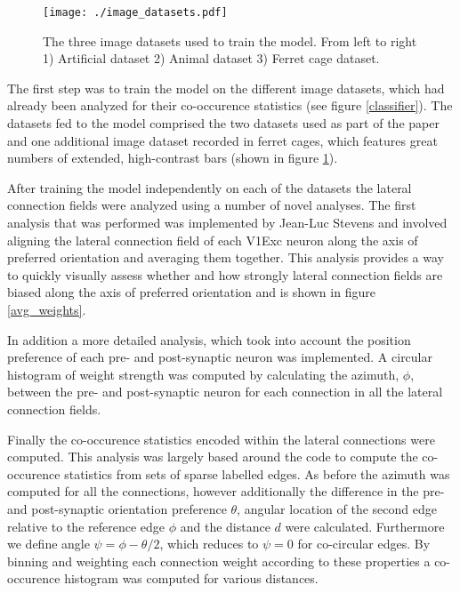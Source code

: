 \begin{figure}
	\centering
	\texttt{[image: ./image\_datasets.pdf]}
	\caption[]%
            {The three image datasets used to train the model. From
      left to right 1) Artificial dataset 2) Animal dataset 3) Ferret
      cage dataset.}
    \label{datasets}
\end{figure}

The first step was to train the model on the different image datasets,
which had already been analyzed for their co-occurence statistics (see
figure \ref{classifier}). The datasets fed to the model comprised the
two datasets used as part of the paper and one additional image
dataset recorded in ferret cages, which features great numbers of
extended, high-contrast bars (shown in figure \ref{datasets}).

After training the model independently on each of the datasets the
lateral connection fields were analyzed using a number of novel
analyses. The first analysis that was performed was implemented by
Jean-Luc Stevens and involved aligning the lateral connection field of
each V1Exc neuron along the axis of preferred orientation and
averaging them together. This analysis provides a way to quickly
visually assess whether and how strongly lateral connection fields are
biased along the axis of preferred orientation and is shown in figure
\ref{avg_weights}.

In addition a more detailed analysis, which took into account the
position preference of each pre- and post-synaptic neuron was
implemented. A circular histogram of weight strength was computed by
calculating the azimuth, $\phi$, between the pre- and post-synaptic
neuron for each connection in all the lateral connection fields.

Finally the co-occurence statistics encoded within the lateral
connections were computed. This analysis was largely based around the
\cite{Perrinet2015} code to compute the co-occurence statistics from
sets of sparse labelled edges. As before the azimuth was computed for
all the connections, however additionally the difference in the pre-
and post-synaptic orientation preference $\theta$, angular location of
the second edge relative to the reference edge $\phi$ and the distance
$d$ were calculated. Furthermore we define angle $\psi = \phi
-\theta/2$, which reduces to $\psi = 0$ for co-circular edges. By
binning and weighting each connection weight according to these
properties a co-occurence histogram was computed for various
distances.


